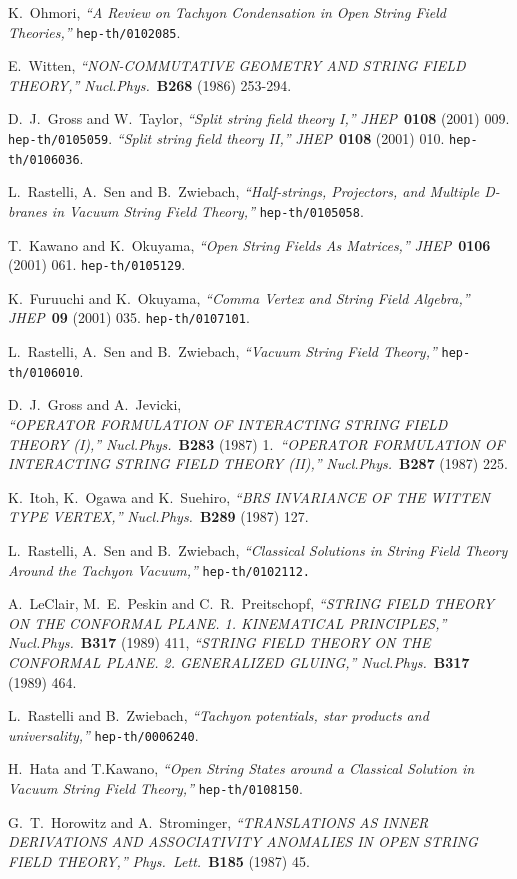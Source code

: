 \documentclass[12pt,a4paper]{article}
\begin{document}
\begin{thebibliography}{99}

K.~Ohmori,
{\it ``A Review on Tachyon Condensation in Open String Field Theories,''}
{\tt hep-th/0102085}.

E.~Witten,
{\it ``NON-COMMUTATIVE GEOMETRY AND STRING FIELD THEORY,''}
{\sl Nucl.Phys.}~{\bf B268} (1986) 253-294.

D.~J.~Gross and W.~Taylor,
{\it ``Split string field theory I,''}
{\sl JHEP}~{\bf 0108} (2001) 009.
{\tt hep-th/0105059}.
{\it ``Split string field theory II,''}
{\sl JHEP}~{\bf 0108} (2001) 010.
{\tt hep-th/0106036}.

L.~Rastelli, A.~Sen and B.~Zwiebach,
{\it ``Half-strings, Projectors, and Multiple D-branes in Vacuum String Field Theory,''}
{\tt hep-th/0105058}.

T.~Kawano and K.~Okuyama,
{\it ``Open String Fields As Matrices,''}
{\sl JHEP}~{\bf 0106} (2001) 061.
{\tt hep-th/0105129}.

K.~Furuuchi and K.~Okuyama,
{\it ``Comma Vertex and String Field Algebra,''}
{\sl JHEP}~{\bf 09} (2001) 035.
{\tt hep-th/0107101}.

L.~Rastelli, A.~Sen and B.~Zwiebach,
{\it ``Vacuum String Field Theory,''}
{\tt hep-th/0106010}.

D.~J.~Gross and A.~Jevicki,\\
{\it ``OPERATOR FORMULATION OF INTERACTING STRING FIELD THEORY (I),''}
{\sl Nucl.Phys.}~{\bf B283} (1987) 1.\ 
{\it ``OPERATOR FORMULATION OF INTERACTING STRING FIELD THEORY (II),''}
{\sl Nucl.Phys.}~{\bf B287} (1987) 225.

K.~Itoh, K.~Ogawa and K.~Suehiro,
{\it ``BRS INVARIANCE OF THE WITTEN TYPE VERTEX,''}
{\sl Nucl.Phys.}~{\bf B289} (1987) 127.

L.~Rastelli, A.~Sen and B.~Zwiebach,
{\it ``Classical Solutions in String Field Theory Around the Tachyon Vacuum,''}
{\tt hep-th/0102112.}

A.~LeClair, M.~E.~Peskin and C.~R.~Preitschopf,
{\it ``STRING FIELD THEORY ON THE CONFORMAL PLANE. 1. KINEMATICAL PRINCIPLES,''}
{\sl Nucl.Phys.}~{\bf B317} (1989) 411,
{\it ``STRING FIELD THEORY ON THE CONFORMAL PLANE. 2. GENERALIZED GLUING,''}
{\sl Nucl.Phys.}~{\bf B317} (1989) 464. 

L.~Rastelli and B.~Zwiebach,
{\it ``Tachyon potentials, star products and universality,''}
{\tt hep-th/0006240}.

H.~Hata and T.Kawano,
{\it ``Open String States around a Classical Solution in Vacuum String Field Theory,''}
{\tt hep-th/0108150}.

G.~T.~Horowitz and A.~Strominger,
{\it ``TRANSLATIONS AS INNER DERIVATIONS AND ASSOCIATIVITY ANOMALIES IN OPEN STRING FIELD THEORY,''}
{\sl Phys.~Lett.}~{\bf B185} (1987) 45.


\end{thebibliography}
\end{document}
